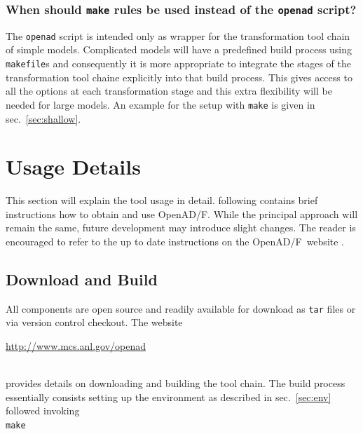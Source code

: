 \documentclass{book}
\newcommand{\OpenADF}{OpenAD/F}
\newcommand{\refsec}[1]{{sec.~\ref{#1}}}
\begin{document}
\subsection{When should {\tt make} rules be used instead of the {\tt openad} script?}\label{sec:useMake}
The \lstinline{openad} script is intended only as wrapper for the transformation tool chain of simple models. 
Complicated models will have a predefined build process using \lstinline{makefile}s and consequently 
it is more appropriate to integrate the stages of the transformation tool chaine explicitly into that
build process. 
This gives access to all the options at each transformation stage and this extra flexibility 
will be needed for large models. An example for the setup with \lstinline{make} is given in \refsec{sec:shallow}.    


\chapter{Usage Details} \label{sec:Usage}
This section will explain the tool usage in detail.  following contains brief instructions how to obtain and use \OpenADF. 
While the principal approach will remain the same, future development may 
introduce slight changes. The reader is encouraged to refer to the 
up to date instructions on the \OpenADF\ website \cite{openadWeb}.

\section{Download and Build}\label{sec:dab}
All components are open source and readily available for download as \lstinline{tar} files
or via version control checkout. 
The website\\[1ex] 
\centerline{\url{http://www.mcs.anl.gov/openad}}\\[1ex]
provides details on downloading and building the tool chain. 
The build process essentially consists setting up the environment as described in 
\refsec{sec:env} followed invoking\\[1ex]   
\hspace*{.3cm}\lstinline{make} \\[1ex] 

\end{document}
